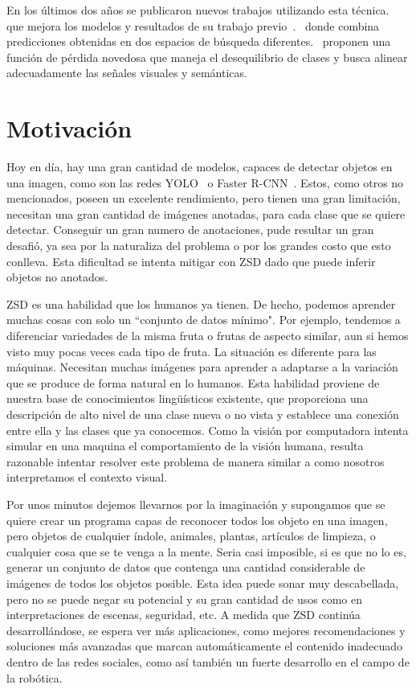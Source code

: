 En los últimos dos años se publicaron nuevos trabajos utilizando esta técnica.~\cite{rahman2020zero} que mejora los modelos y resultados de su trabajo previo~\cite{rahman2018zero}.~\cite{gupta2020multi} donde combina predicciones obtenidas en dos espacios de búsqueda diferentes.~\cite{rahman2020improved} proponen  una función de pérdida novedosa que maneja el desequilibrio de clases y busca alinear adecuadamente las señales visuales y semánticas.

\section{Motivación} \label{sec:motivacion}

Hoy en día, hay una gran cantidad de modelos, capaces de detectar objetos en una imagen, como son las redes YOLO~\cite{redmon2016you} o Faster R-CNN~\cite{ren2015faster}. Estos, como otros no mencionados, poseen un excelente rendimiento, pero tienen una gran limitación, necesitan una gran cantidad de imágenes anotadas, para cada clase que se quiere detectar. Conseguir un gran numero de anotaciones, pude resultar un gran desafió, ya sea por la naturaliza del problema o por los grandes costo que esto conlleva. Esta dificultad se intenta mitigar con ZSD dado que puede inferir objetos no anotados.

ZSD es una habilidad que los humanos ya tienen. De hecho, podemos aprender muchas cosas con solo un ``conjunto de datos mínimo". Por ejemplo, tendemos a diferenciar  variedades de la misma fruta o frutas de aspecto similar, aun si hemos visto muy pocas veces cada tipo de fruta. La situación es diferente para las máquinas. Necesitan muchas imágenes para aprender a adaptarse a la variación que se produce de forma natural en lo humanos. Esta habilidad proviene de nuestra base de conocimientos lingüísticos existente, que proporciona una descripción de alto nivel de una clase nueva o no vista y establece una conexión entre ella y las clases que ya conocemos. Como la visión por computadora intenta simular en una maquina el comportamiento de la visión humana, resulta razonable intentar resolver este problema de manera similar a como nosotros interpretamos el contexto visual.

Por unos minutos dejemos llevarnos por la imaginación y supongamos que se quiere crear un programa capas de reconocer todos los objeto en una imagen, pero objetos de cualquier índole, animales, plantas, artículos de limpieza, o cualquier cosa que se te venga a la mente. Seria casi imposible, si es que no lo es, generar un conjunto de datos que contenga una cantidad considerable de imágenes de todos los objetos posible. Esta idea puede sonar muy descabellada, pero no se puede negar su potencial y su gran cantidad de usos como en interpretaciones de escenas, seguridad, etc. A medida que ZSD continúa desarrollándose, se espera ver más aplicaciones, como mejores recomendaciones y soluciones más avanzadas que marcan automáticamente el contenido inadecuado dentro de las redes sociales, como así también un fuerte desarrollo en el campo de la robótica.

